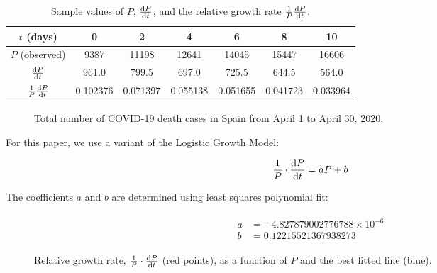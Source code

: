 \documentclass[12pt]{article}
\begin{document}

\begin{table}[h!]
\centering
\begin{tabular}{ |c|c|c|c|c|c|c| }
  \hline
  $t$ (days) & 0 & 2 & 4 & 6 & 8 & 10\\
  \hline
  $P$ (observed) & 9387 & 11198 & 12641 & 14045 & 15447 & 16606 \\
  \hline
  $\diff{P}{t}$ & 961.0 & 799.5 & 697.0 & 725.5 & 644.5 & 564.0 \\
  \hline
  $\frac{1}{P} \diff{P}{t}$ & 0.102376 & 0.071397 & 0.055138 & 0.051655 & 0.041723 & 0.033964 \\
  \hline
\end{tabular}
\caption{Sample values of $P$, $\diff{P}{t}$, and the relative growth rate $\frac{1}{P} \diff{P}{t}$.}
\label{table:2}
\end{table}

\begin{figure}[H]
  \begin{center}
    
  \end{center}
  \caption{Total number of COVID-19 death cases in Spain from April 1 to April 30, 2020.}
\end{figure}

For this paper, we use a variant of the Logistic Growth Model:

\begin{equation} \label{model_eqn}
\frac{1}{P} \cdot \diff{P}{t} = aP + b
\end{equation}

The coefficients $a$ and $b$ are determined using least squares polynomial fit:

\begin{align} \label{coef}
\begin{split}
a &= -4.827879002776788 \times 10^{-6} \\
b &= 0.12215521367938273
\end{split}
\end{align}

\begin{figure}[H]
  \begin{center}
    
  \end{center}
  \caption{Relative growth rate, $\frac{1}{P} \cdot \diff{P}{t}$ (red points), as a function of $P$ and the best fitted line (blue).}
\end{figure}
\end{document}
